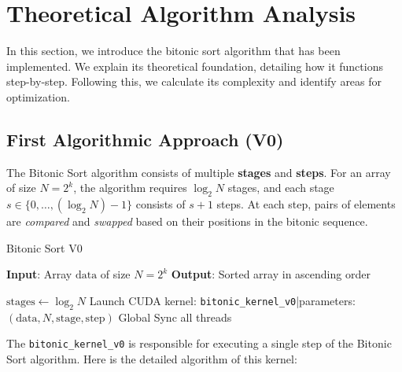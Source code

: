 \documentclass[12pt]{article}
\begin{document}
\pagestyle{fancy}
\chead{}

\section{Theoretical Algorithm Analysis}
In this section, we introduce the bitonic sort algorithm that has been implemented. We explain its theoretical foundation, detailing how it functions step-by-step. Following this, we calculate its complexity and identify areas for optimization.

\subsection{First Algorithmic Approach (V0)}

The Bitonic Sort algorithm consists of multiple \textbf{stages} and \textbf{steps}. For an array of size \( N = 2^k \), the algorithm requires \( \log_2 N \) stages, and each stage \( s \in \{0, \dots, (\log_2 N) - 1\} \) consists of \( s + 1 \) steps. At each step, pairs of elements are \textit{compared} and \textit{swapped} based on their positions in the bitonic sequence.

\begin{algorithm}[H]
\caption{Bitonic Sort V0}\label{alg:v0}
\begin{algorithmic}[1]
\Require \textbf{Input}: Array \( \text{data} \) of size \( N = 2^k \)
\Ensure \textbf{Output}: Sorted array in ascending order

\State \( \text{stages} \gets \log_2 N \) 
        \State Launch CUDA kernel: \texttt{bitonic\_kernel\_v0}|parameters: \( (\text{data}, N, \text{stage}, \text{step}) \)
        \State Global Sync all threads 
    \EndFor
\EndFor
\end{algorithmic}
\end{algorithm}

The \texttt{bitonic\_kernel\_v0} is responsible for executing a single step of the Bitonic Sort algorithm. Here is the detailed algorithm of this kernel:
\end{document}
